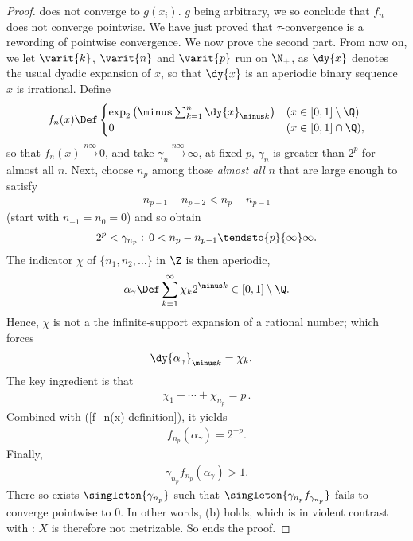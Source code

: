 \begin{proof}
does not converge to $g(x_i)$. %
$g$ being arbitrary, we so conclude that $f_n$ does not converge pointwise. %
We have just proved that 
%
  $\tau$-convergence is a rewording of pointwise convergence.
%
We now prove the second part.
%
From now on, we let %
%
  $\varit{k}$, $\varit{n}$ and $\varit{p}$ 
%
run on $\N_+$, as $\dy{x}$ denotes the usual dyadic expansion of $x$, %
so that $\dy{x}$ is an aperiodic binary sequence \iif $x$ is irrational. 
%
Define
%
\begin{align}
  \label{f_n(x) definition}
  f_n(x) 
    \Def 
  \begin{cases}
      \exp_2\left({\minus\sum_{k= 1}^{n} {\dy{x}_{\minus k}}}\right) 
        & 
          (x \in [0, 1]\setminus \Q )\\
      0 
        & 
          (x \in [0,1]\cap \Q), 
    \end{cases}
\end{align}
%
so that $f_n(x) \overset{n\infty}{\longrightarrow} 0$, %
%
and take %
%
  $\gamma_n \overset{n\infty}{\longrightarrow} \infty$, \ie 
%
  at fixed $p$, $\gamma_{n}$ is greater than $2^{p}$ for almost all $n$.
%
Next, choose $n_{p}$ among those \textit{almost all} $n$ that are 
large enough to satisfy 
%
  \begin{align}
    n_{p-1} - n_{p-2} < n_{p}- n_{p-1} 
  \end{align}
%
(start with $n_{\minus 1} = n_{0} = 0$) and so obtain 
%
  \begin{align}
    2^p < \gamma_{n_{p}}:\, 
      0< n_{p} - n_{p-1}\tendsto{p}{\infty} \infty.
  \end{align}
%
The indicator $\chi$ of 
%
  $\{n_{1}, n_{2}, \dots\}$ in $\Z$
%
is then aperiodic, \ie 
%
  \def\xgamma{\alpha_{\gamma}}
  \begin{align}
    \xgamma 
      \Def
    \sum_{k=1}^\infty \chi_k 2^{\minus k} \in [0, 1]\setminus \Q .
  \end{align}
%
Hence, $\chi$ is not a the infinite-support expansion of a rational number; %
which forces  %
%
  \begin{align}
    \dy{\xgamma}_{\minus k} &= \chi_{k}.
  \end{align}
%
The key ingredient is that %
%
  \begin{align}
    \chi_1 + \cdots + \chi_{n_{p}} = p\,.
  \end{align}
%
Combined with (\ref{f_n(x) definition}), it yields %
%
  \begin{align}
    f_{n_{p}}(\xgamma) = 2^{\minus p}.
  \end{align}
%
Finally,
%
  \begin{align}
    \gamma_{n_{p}} f_{n_{p}}(\xgamma) > 1.
  \end{align}
%
There so exists $\singleton{\gamma_{n_p}}$ such that %
%
  $\singleton{\gamma_{n_p} f_{\gamma_{n_p}}}$ %
%
fails to converge pointwise to $0$. %
In other words, (b) holds, which is in violent contrast with %
: $X$ is therefore not metrizable. So ends the proof.
\end{proof}
